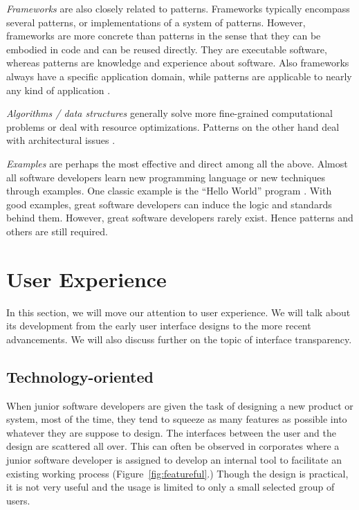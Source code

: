 \documentclass{acm_proc_article-sp}
\begin{document}
\textit{Frameworks} are also closely related to patterns. Frameworks
typically encompass several patterns, or implementations of a system
of patterns. However, frameworks are more concrete than patterns in
the sense that they can be embodied in code and can be reused
directly. They are executable software, whereas patterns are knowledge
and experience about software. Also frameworks always have a specific
application domain, while patterns are applicable to nearly any kind
of application \citep{patterns:gamma}.

\textit{Algorithms / data structures} generally solve more
fine-grained computational problems or deal with resource
optimizations. Patterns on the other hand deal with architectural
issues \citep{patterns:appleton}.

\textit{Examples} are perhaps the most effective and direct among all
the above. Almost all software developers learn new programming
language or new techniques through examples. One classic example is
the ``Hello World'' program \citep{c:kernighan}. With good examples,
great software developers can induce the logic and standards behind
them. However, great software developers rarely exist. Hence patterns
and others are still required.


\section{User Experience}
\label{sec:ux}
In this section, we will move our attention to user experience. We
will talk about its development from the early user interface designs
to the more recent advancements. We will also discuss further on the
topic of interface transparency.

\subsection{Technology-oriented}
When junior software developers are given the task of designing a new
product or system, most of the time, they tend to squeeze as many
features as possible into whatever they are suppose to design. The
interfaces between the user and the design are scattered all
over. This can often be observed in corporates where a junior software
developer is assigned to develop an internal tool to facilitate an
existing working process (Figure~\ref{fig:featureful}.)  Though the
design is practical, it is not very useful and the usage is limited to
only a small selected group of users.
\end{document}
